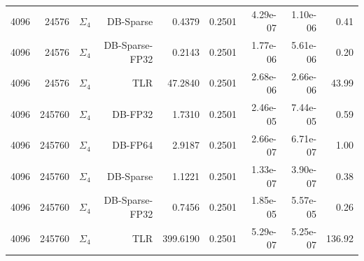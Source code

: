 \begin{tabular}{|r|r|r|r|r|r|r|r|r|}
  4096 & 24576 & $\Sigma_4$ & DB-Sparse & 0.4379 & 0.2501 & 4.29e-07 & 1.10e-06 & 0.41 \\
  4096 & 24576 & $\Sigma_4$ & DB-Sparse-FP32 & 0.2143 & 0.2501 & 1.77e-06 & 5.61e-06 & 0.20 \\
  4096 & 24576 & $\Sigma_4$ & TLR & 47.2840 & 0.2501 & 2.68e-06 & 2.66e-06 & 43.99 \\
  4096 & 245760 & $\Sigma_4$ & DB-FP32 & 1.7310 & 0.2501 & 2.46e-05 & 7.44e-05 & 0.59 \\
  4096 & 245760 & $\Sigma_4$ & DB-FP64 & 2.9187 & 0.2501 & 2.66e-07 & 6.71e-07 & 1.00 \\
  4096 & 245760 & $\Sigma_4$ & DB-Sparse & 1.1221 & 0.2501 & 1.33e-07 & 3.90e-07 & 0.38 \\
  4096 & 245760 & $\Sigma_4$ & DB-Sparse-FP32 & 0.7456 & 0.2501 & 1.85e-05 & 5.57e-05 & 0.26 \\
  4096 & 245760 & $\Sigma_4$ & TLR & 399.6190 & 0.2501 & 5.29e-07 & 5.25e-07 & 136.92 \\
  \hline
\end{tabular}
